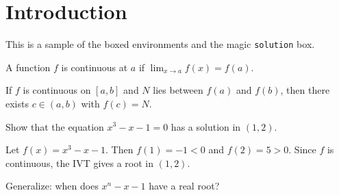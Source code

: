 \documentclass{didactic}
\begin{document}
\maketitle

\section{Introduction}

This is a sample of the boxed environments and the magic
\texttt{solution} box.

\begin{definition}[Continuity]
	A function $f$ is continuous at $a$ if
	$\lim_{x \to a} f(x) = f(a)$.
\end{definition}

\begin{theorem}
	If $f$ is continuous on $[a,b]$ and $N$ lies between $f(a)$
	and $f(b)$, then there exists $c \in (a,b)$ with $f(c) = N$.
\end{theorem}

\begin{exercise}
	Show that the equation $x^3 - x - 1 = 0$ has a solution in
	$(1, 2)$.
\end{exercise}

\begin{solution}[2.5in]
	Let $f(x) = x^3 - x - 1$. Then $f(1) = -1 < 0$ and
	$f(2) = 5 > 0$. Since $f$ is continuous, the IVT gives a
	root in $(1, 2)$.
\end{solution}

\begin{challenge}
	Generalize: when does $x^n - x - 1$ have a real root?
\end{challenge}
\end{document}

